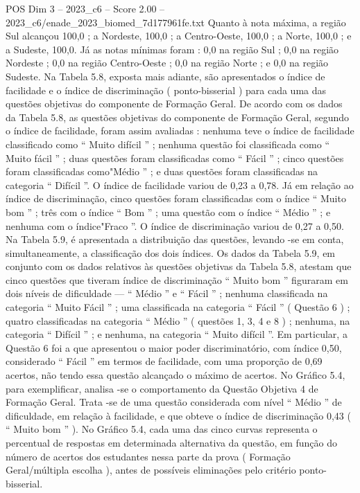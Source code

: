 \begin{textsample}{POS Dim 3 – 2023\_c6 – Score 2.00 – 2023\_c6/enade\_2023\_biomed\_7d177961fe.txt}
Quanto à nota máxima, a região Sul alcançou 100,0 ; a Nordeste, 100,0 ; a Centro-Oeste, 100,0 ; a Norte, 100,0 ; e a Sudeste, 100,0.
Já as notas mínimas foram : 0,0 na região Sul ; 0,0 na região Nordeste ; 0,0 na região Centro-Oeste ; 0,0 na região Norte ; e 0,0 na região Sudeste.
Na Tabela 5.8, exposta mais adiante, são apresentados o índice de facilidade e o índice de discriminação ( ponto-bisserial ) para cada uma das questões objetivas do componente de Formação Geral.
De acordo com os dados da Tabela 5.8, as questões objetivas do componente de Formação Geral, segundo o índice de facilidade, foram assim avaliadas : nenhuma teve o índice de facilidade classificado como “ Muito difícil ” ; nenhuma questão foi classificada como “ Muito fácil ” ; duas questões foram classificadas como “ Fácil ” ; cinco questões foram classificadas como"Médio ” ; e duas questões foram classificadas na categoria “ Difícil ”.
O índice de facilidade variou de 0,23 a 0,78.
Já em relação ao índice de discriminação, cinco questões foram classificadas com o índice “ Muito bom ” ; três com o índice “ Bom ” ; uma questão com o índice “ Médio ” ; e nenhuma com o índice"Fraco ”.
O índice de discriminação variou de 0,27 a 0,50.
Na Tabela 5.9, é apresentada a distribuição das questões, levando -se em conta, simultaneamente, a classificação dos dois índices.
Os dados da Tabela 5.9, em conjunto com os dados relativos às questões objetivas da Tabela 5.8, atestam que cinco questões que tiveram índice de discriminação “ Muito bom ” figuraram em dois níveis de dificuldade — “ Médio ” e “ Fácil ” ; nenhuma classificada na categoria “ Muito Fácil ” ; uma classificada na categoria “ Fácil ” ( Questão 6 ) ; quatro classificadas na categoria “ Médio ” ( questões 1, 3, 4 e 8 ) ; nenhuma, na categoria “ Difícil ” ; e nenhuma, na categoria “ Muito difícil ”.
Em particular, a Questão 6 foi a que apresentou o maior poder discriminatório, com índice 0,50, considerado “ Fácil ” em termos de facilidade, com uma proporção de 0,69 acertos, não tendo essa questão alcançado o máximo de acertos.
No Gráfico 5.4, para exemplificar, analisa -se o comportamento da Questão Objetiva 4 de Formação Geral.
Trata -se de uma questão considerada com nível “ Médio ” de dificuldade, em relação à facilidade, e que obteve o índice de discriminação 0,43 ( “ Muito bom ” ).
No Gráfico 5.4, cada uma das cinco curvas representa o percentual de respostas em determinada alternativa da questão, em função do número de acertos dos estudantes nessa parte da prova ( Formação Geral/múltipla escolha ), antes de possíveis eliminações pelo critério ponto-bisserial.

\end{textsample}
